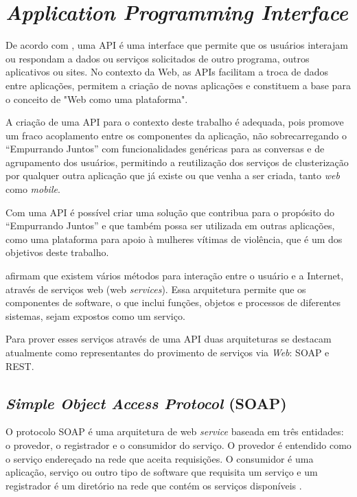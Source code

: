 \chapter{\textit{Application Programming Interface}} \label{cap:api}

De acordo com , uma API é uma interface que permite que os 
usuários interajam ou respondam a dados ou serviços solicitados de outro programa, outros
aplicativos ou sites. No contexto da Web, as APIs facilitam a troca de dados entre 
aplicações, permitem a criação de novas aplicações e constituem a base para o conceito de 
"Web como uma plataforma".

A criação de uma API para o contexto deste trabalho é adequada, pois promove um fraco acoplamento
entre os componentes da aplicação, não sobrecarregando o ``Empurrando Juntos'' com funcionalidades genéricas
para as conversas e de agrupamento dos usuários,
permitindo a reutilização dos serviços de clusterização por qualquer
outra aplicação que já existe ou que venha a ser criada, tanto \textit{web} como \textit{mobile}.

Com uma API é possível criar uma solução que contribua para o propósito do ``Empurrando Juntos'' e que também
possa ser utilizada em outras aplicações, como uma plataforma para apoio à mulheres vítimas de violência, que é
um dos objetivos deste trabalho.

 afirmam que existem vários métodos para interação entre o  
usuário e a Internet, através de serviços web (web \textit{services}).
Essa arquitetura permite que os componentes de software, o que inclui funções,
objetos e processos de diferentes sistemas, sejam expostos como um serviço.

Para prover esses serviços através de uma API duas arquiteturas se destacam atualmente como representantes do provimento
de serviços via \textit{Web}: SOAP e REST.

\section{\textit{Simple Object Access Protocol} (SOAP)}

O protocolo SOAP é uma arquitetura de web \textit{service} baseada em três entidades: o provedor, o registrador e o consumidor do serviço. O provedor é entendido como o serviço endereçado na rede
que aceita requisições. O consumidor é uma aplicação, serviço ou outro tipo de software que
requisita um serviço e um registrador é um diretório na rede que contém os serviços disponíveis \cite{mumbaikar}.

